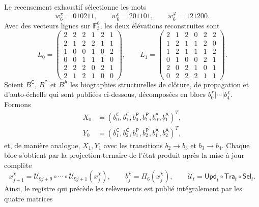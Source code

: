 Le recensement exhaustif sélectionne les mots
\[
 w_6^\pi=010211,\qquad
 w_6^e=201101,\qquad
 w_6^\varphi=121200.
\]
Avec des vecteurs lignes sur \(\mathbb F_3^6\), les deux élévations reconstruites
sont
\[
L_0=
\begin{pmatrix}
2&2&2&1&2&1\\
2&1&2&2&1&1\\
1&0&0&1&0&2\\
0&0&1&1&1&0\\
2&2&2&0&2&1\\
2&1&2&1&0&0
\end{pmatrix},
\qquad
L_1=
\begin{pmatrix}
2&1&2&0&2&2\\
1&2&1&1&2&0\\
1&2&1&1&1&2\\
0&1&0&0&2&1\\
2&0&2&1&0&1\\
0&2&2&2&1&1
\end{pmatrix}.
\]
Soient \(B^{\mathsf C}\), \(B^{\mathsf P}\) et \(B^{\mathsf A}\) les
biographies structurelles de clôture, de propagation et d'auto-échelle qui sont
publiées ci-dessous, décomposées en blocs
\(b_0^\chi|\cdots|b_4^\chi\). Formons
\[
 \begin{aligned}
 X_0&=(b_0^{\mathsf C},b_1^{\mathsf C},
       b_0^{\mathsf P},b_1^{\mathsf P},
       b_0^{\mathsf A},b_1^{\mathsf A})^T,\\
 Y_0&=(b_1^{\mathsf C},b_2^{\mathsf C},
       b_1^{\mathsf P},b_2^{\mathsf P},
       b_1^{\mathsf A},b_2^{\mathsf A})^T,
 \end{aligned}
\]
et, de manière analogue, \(X_1,Y_1\) avec les transitions
\(b_2\to b_3\) et \(b_3\to b_4\). Chaque bloc s'obtient par la projection
ternaire de l'état produit après la mise à jour complète
\[
 x_{j+1}^{\chi}
 =\mathcal U_{9j+9}\circ\cdots\circ\mathcal U_{9j+1}(x_j^{\chi}),
 \qquad
 b_j^{\chi}=\Pi_6(x_j^{\chi}),
 \qquad
 \mathcal U_t=\mathsf{Upd}_t\circ\mathsf{Tra}_t\circ\mathsf{Sel}_t.
\]
Ainsi, le registre qui précède les relèvements est publié
intégralement par les quatre matrices
\begingroup\scriptsize
